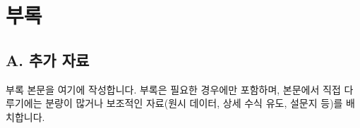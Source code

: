 \chapter*{부\quad 록}

\section*{A. 추가 자료}

부록 본문을 여기에 작성합니다. 부록은 필요한 경우에만 포함하며,
본문에서 직접 다루기에는 분량이 많거나 보조적인 자료(원시 데이터,
상세 수식 유도, 설문지 등)를 배치합니다.

